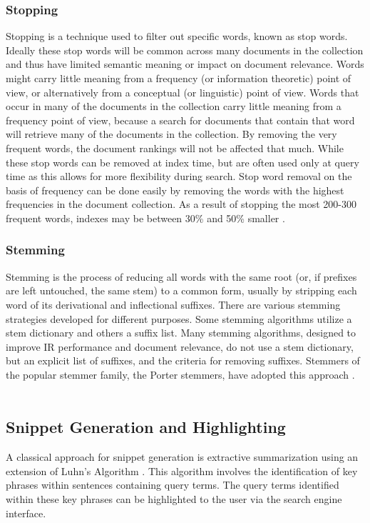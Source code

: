 \documentclass[conference]{IEEEtran}
\begin{document}
\subsubsection{Stopping}
Stopping is a technique used to filter out specific words, known as stop words. Ideally these stop words will be common across many documents in the collection and thus have limited semantic meaning or impact on document relevance. Words might carry little meaning from a frequency (or information theoretic) point of view, or alternatively from a conceptual (or linguistic) point of view. Words that occur in many of the documents in the collection carry little meaning from a frequency point of view, because a search for documents that contain that word will retrieve many of the documents in the collection. By removing the very frequent words, the document rankings will not be affected that much. While these stop words can be removed at index time, but are often used only at query time as this allows for more flexibility during search. Stop word removal on the basis of frequency can be done easily by removing the words with the highest
frequencies in the document collection. As a result of stopping the most 200-300 frequent words, indexes may be between 30\% and 50\% smaller \cite{djoerd2001statistical}.
\subsubsection{Stemming}
Stemming is the process of reducing all words with the same root (or, if prefixes are left untouched, the same stem) to a common form, usually by stripping each word of its derivational
and inflectional suffixes. There are various stemming strategies developed for different purposes\cite{Lovins1968DevelopmentOA}. Some stemming algorithms utilize a stem dictionary and others a suffix list. Many stemming algorithms, designed to improve IR performance and document relevance, do not use
a stem dictionary, but an explicit list of suffixes, and the criteria for removing suffixes. Stemmers of the popular stemmer family, the Porter stemmers, have adopted this approach \cite{airio2006word}.
\\\\
\subsection{Snippet Generation and Highlighting}
A classical approach for snippet generation is extractive summarization using an extension of Luhn's Algorithm \cite{luhn1958automatic}. This algorithm involves the identification of key phrases within sentences containing query terms. The query terms identified within these key phrases can be highlighted to the user via the search engine interface.
\end{document}
